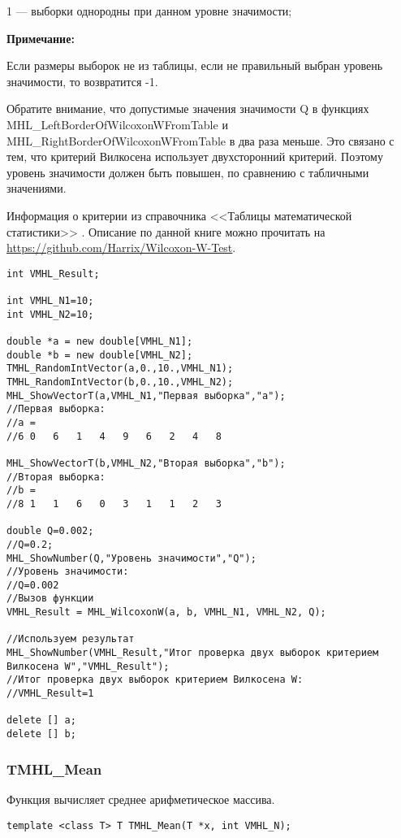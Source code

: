 \documentclass[a4paper,12pt]{article}
\begin{document}
 1 --- выборки однородны  при данном уровне значимости;

\textbf{Примечание:}

 Если размеры выборок не из таблицы, если не правильный выбран уровень значимости, то возвратится -1.
 
 Обратите внимание, что допустимые значения значимости Q в функциях MHL\_LeftBorderOfWilcoxonWFromTable и MHL\_RightBorderOfWilcoxonWFromTable в два раза меньше. Это связано с тем, что критерий Вилкосена использует двухсторонний критерий. Поэтому уровень значимости должен быть повышен, по сравнению с табличными значениями.
	 
 Информация о критерии из  справочника <<Таблицы математической статистики>> \cite[с. 93]{book:Bolshev1983}. Описание по данной книге можно прочитать на \href {https://github.com/Harrix/Wilcoxon-W-Test} {https://github.com/Harrix/Wilcoxon-W-Test}.



\begin{lstlisting}[label=code_use_MHL_WilcoxonW,caption=Пример использования]
int VMHL_Result;

int VMHL_N1=10;
int VMHL_N2=10;

double *a = new double[VMHL_N1];
double *b = new double[VMHL_N2];
TMHL_RandomIntVector(a,0.,10.,VMHL_N1);
TMHL_RandomIntVector(b,0.,10.,VMHL_N2);
MHL_ShowVectorT(a,VMHL_N1,"Первая выборка","a");
//Первая выборка:
//a =	
//6	0	6	1	4	9	6	2	4	8

MHL_ShowVectorT(b,VMHL_N2,"Вторая выборка","b");
//Вторая выборка:
//b =	
//8	1	1	6	0	3	1	1	2	3

double Q=0.002;
//Q=0.2;
MHL_ShowNumber(Q,"Уровень значимости","Q");
//Уровень значимости:
//Q=0.002
//Вызов функции
VMHL_Result = MHL_WilcoxonW(a, b, VMHL_N1, VMHL_N2, Q);

//Используем результат
MHL_ShowNumber(VMHL_Result,"Итог проверка двух выборок критерием Вилкосена W","VMHL_Result");
//Итог проверка двух выборок критерием Вилкосена W:
//VMHL_Result=1

delete [] a;
delete [] b;
\end{lstlisting}

\subsubsection{TMHL\_Mean}\label{TMHL_Mean}

Функция вычисляет среднее арифметическое массива.


\begin{lstlisting}[label=code_syntax_TMHL_Mean,caption=Синтаксис]
template <class T> T TMHL_Mean(T *x, int VMHL_N);
\end{lstlisting}
\end{document}
